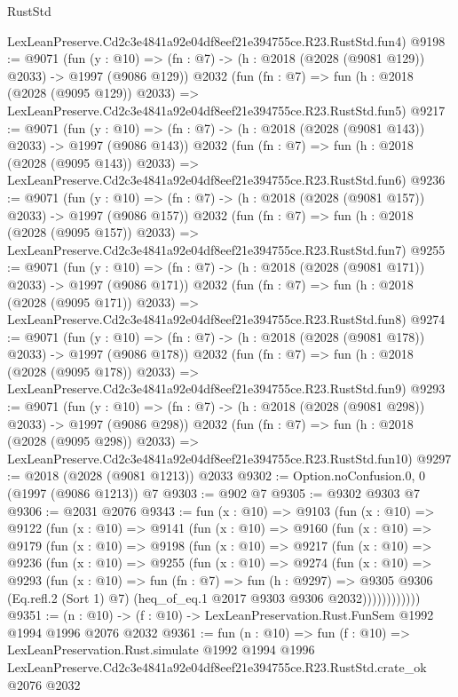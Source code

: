 \begin{lexlean}{RustStd}
\begin{coremodule}
    LexLeanPreserve.Cd2c3e4841a92e04df8eef21e394755ce.R23.RustStd.fun4)
@9198 := @9071
    (fun (y : @10) => (fn : @7) -> (h : @2018 (@2028 (@9081 @129)) @2033) -> @1997 (@9086 @129))
    @2032
    (fun (fn : @7) =>
    fun (h : @2018 (@2028 (@9095 @129)) @2033) =>
    LexLeanPreserve.Cd2c3e4841a92e04df8eef21e394755ce.R23.RustStd.fun5)
@9217 := @9071
    (fun (y : @10) => (fn : @7) -> (h : @2018 (@2028 (@9081 @143)) @2033) -> @1997 (@9086 @143))
    @2032
    (fun (fn : @7) =>
    fun (h : @2018 (@2028 (@9095 @143)) @2033) =>
    LexLeanPreserve.Cd2c3e4841a92e04df8eef21e394755ce.R23.RustStd.fun6)
@9236 := @9071
    (fun (y : @10) => (fn : @7) -> (h : @2018 (@2028 (@9081 @157)) @2033) -> @1997 (@9086 @157))
    @2032
    (fun (fn : @7) =>
    fun (h : @2018 (@2028 (@9095 @157)) @2033) =>
    LexLeanPreserve.Cd2c3e4841a92e04df8eef21e394755ce.R23.RustStd.fun7)
@9255 := @9071
    (fun (y : @10) => (fn : @7) -> (h : @2018 (@2028 (@9081 @171)) @2033) -> @1997 (@9086 @171))
    @2032
    (fun (fn : @7) =>
    fun (h : @2018 (@2028 (@9095 @171)) @2033) =>
    LexLeanPreserve.Cd2c3e4841a92e04df8eef21e394755ce.R23.RustStd.fun8)
@9274 := @9071
    (fun (y : @10) => (fn : @7) -> (h : @2018 (@2028 (@9081 @178)) @2033) -> @1997 (@9086 @178))
    @2032
    (fun (fn : @7) =>
    fun (h : @2018 (@2028 (@9095 @178)) @2033) =>
    LexLeanPreserve.Cd2c3e4841a92e04df8eef21e394755ce.R23.RustStd.fun9)
@9293 := @9071
    (fun (y : @10) => (fn : @7) -> (h : @2018 (@2028 (@9081 @298)) @2033) -> @1997 (@9086 @298))
    @2032
    (fun (fn : @7) =>
    fun (h : @2018 (@2028 (@9095 @298)) @2033) =>
    LexLeanPreserve.Cd2c3e4841a92e04df8eef21e394755ce.R23.RustStd.fun10)
@9297 := @2018 (@2028 (@9081 @1213)) @2033
@9302 := Option.noConfusion.{0, 0} (@1997 (@9086 @1213)) @7
@9303 := @902 @7
@9305 := @9302 @9303 @7
@9306 := @2031 @2076
@9343 := fun (x : @10) =>
  @9103
    (fun (x : @10) =>
    @9122
      (fun (x : @10) =>
      @9141
        (fun (x : @10) =>
        @9160
          (fun (x : @10) =>
          @9179
            (fun (x : @10) =>
            @9198
              (fun (x : @10) =>
              @9217
                (fun (x : @10) =>
                @9236
                  (fun (x : @10) =>
                  @9255
                    (fun (x : @10) =>
                    @9274
                      (fun (x : @10) =>
                      @9293
                        (fun (x : @10) =>
                        fun (fn : @7) =>
                        fun (h : @9297) =>
                        @9305
                          @9306
                          (Eq.refl.{2} (Sort 1) @7)
                          (heq_of_eq.{1} @2017 @9303 @9306 @2032))))))))))))
@9351 := (n : @10) -> (f : @10) -> LexLeanPreservation.Rust.FunSem @1992 @1994 @1996 @2076 @2032
@9361 := fun (n : @10) =>
  fun (f : @10) =>
  LexLeanPreservation.Rust.simulate
    @1992
    @1994
    @1996
    LexLeanPreserve.Cd2c3e4841a92e04df8eef21e394755ce.R23.RustStd.crate_ok
    @2076
    @2032
\end{coremodule}
\end{lexlean}
